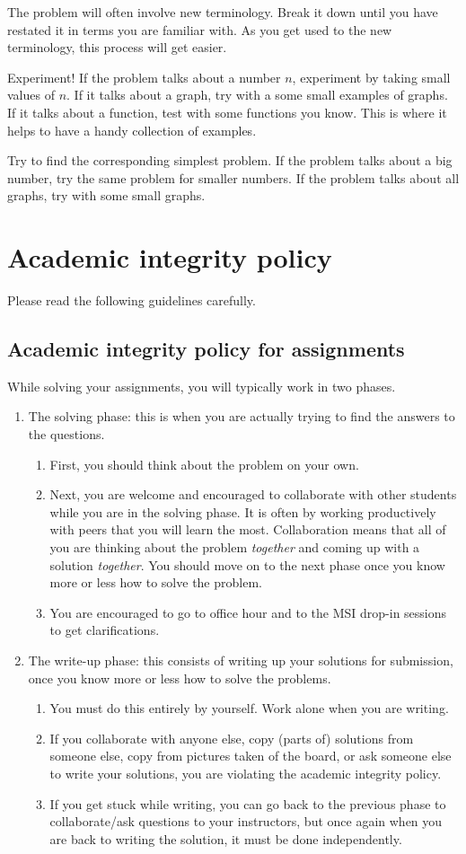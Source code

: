 \documentclass{amsart}
\begin{document}
The problem will often involve new terminology.
Break it down until you have restated it in terms you are familiar with.
As you get used to the new terminology, this process will get easier.

Experiment!
If the problem talks about a number \(n\), experiment by taking small values of \(n\).
If it talks about a graph, try with a some small examples of graphs.
If it talks about a function, test with some functions you know.
This is where it helps to have a handy collection of examples.

Try to find the corresponding simplest problem.
If the problem talks about a big number, try the same problem for smaller numbers.
If the problem talks about all graphs, try with some small graphs.
\section{Academic integrity policy}
\label{sec:org2c7a732}
Please read the following guidelines carefully. 
\subsection{Academic integrity policy for assignments}
\label{sec:orgc986437}
While solving your assignments, you will typically work in two phases.
\begin{enumerate}
\item The solving phase: this is when you are actually trying to find the answers to the questions.
\begin{enumerate}
\item First, you should think about the problem on your own.
\item Next, you are welcome and encouraged to collaborate with other students while you are in the solving phase. It is often by working productively with peers that you will learn the most. Collaboration means that all of you are thinking about the problem \emph{together} and coming up with a solution \emph{together}.
You should move on to the next phase once you know more or less how to solve the problem.
\item You are encouraged to go to office hour and to the MSI drop-in sessions to get clarifications.
\end{enumerate}
\item The write-up phase: this consists of writing up your solutions for submission, once you know more or less how to solve the problems.
\begin{enumerate}
\item You must do this entirely by yourself. Work alone when you are writing.
\item If you collaborate with anyone else, copy (parts of) solutions from someone else, copy from pictures taken of the board, or ask someone else to write your solutions, you are violating the academic integrity policy.
\item If you get stuck while writing, you can go back to the previous phase to collaborate/ask questions to your instructors, but once again when you are back to writing the solution, it must be done independently.
\end{enumerate}
\end{enumerate}
\end{document}
